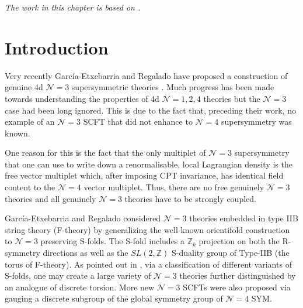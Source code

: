 \documentclass[main.tex]{subfiles}
\begin{document}
 
\textit{The work in this chapter is based on \cite{Bourton2018}.}
\section{Introduction}
Very recently Garc{\'i}a-Etxebarria and Regalado have proposed a construction of genuine 4d $\mathcal{N}=3$ supersymmetric theories \cite{Garcia-Etxebarria:2015wns}. Much progress has been made towards understanding the properties of 4d $\mathcal{N} = 1,2,4$ theories but the $\mathcal{N} = 3$ case had been long ignored.
This is due to the fact that, preceding their work, no example of an $\mathcal{N} = 3$ SCFT that did not enhance to $\mathcal{N}=4$ supersymmetry was known.

One reason for this is the fact that the only multiplet of $\mathcal{N} = 3$ supersymmetry that one can use to write down a renormalisable, local Lagrangian density is the free vector multiplet which, after imposing CPT invariance, has identical field content to the $\mathcal{N}=4$ vector multiplet. Thus, there are no free genuinely $\mathcal{N} = 3$ theories and all genuinely $\mathcal{N} = 3$ theories have to be strongly coupled.

Garc{\'i}a-Etxebarria and Regalado considered $\mathcal{N} = 3$ theories embedded in type IIB string theory (F-theory) by generalizing the well known orientifold construction to $\mathcal{N} = 3$ preserving S-folds.
The S-fold includes a $\mathbb{Z}_k$ projection on both the R-symmetry directions as well as the $SL(2,\mathbb{Z})$
S-duality group of Type-IIB (the torus of F-theory). As pointed out in \cite{Aharony:2016kai}, via a classification of different variants of S-folds, one may create a large variety of $\mathcal{N}=3$ theories further distinguished by an analogue of discrete torsion. More new $\mathcal{N}=3$ SCFTs were also proposed \cite{Argyres:2016yzz} via gauging a discrete subgroup of the global symmetry group of $\mathcal{N}=4$ SYM.
\end{document}
